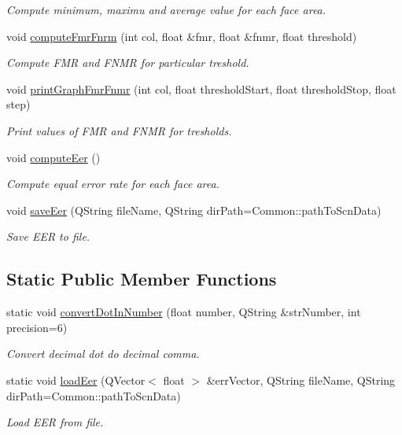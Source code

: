 \begin{DoxyCompactItemize}
\begin{DoxyCompactList}\small\item\em Compute minimum, maximu and average value for each face area. \end{DoxyCompactList}\item 
void \hyperlink{class_stats_a473b818344949038f30b72de2e88e323}{compute\+Fmr\+Fnrm} (int col, float \&fmr, float \&fnmr, float threshold)
\begin{DoxyCompactList}\small\item\em Compute F\+M\+R and F\+N\+M\+R for particular treshold. \end{DoxyCompactList}\item 
void \hyperlink{class_stats_a28e28f91a188f277f86c7de6c511b415}{print\+Graph\+Fmr\+Fnmr} (int col, float threshold\+Start, float threshold\+Stop, float step)
\begin{DoxyCompactList}\small\item\em Print values of F\+M\+R and F\+N\+M\+R for tresholds. \end{DoxyCompactList}\item 
\hypertarget{class_stats_a6f79c928497addbbd269f4723c5d9deb}{void \hyperlink{class_stats_a6f79c928497addbbd269f4723c5d9deb}{compute\+Eer} ()}\label{class_stats_a6f79c928497addbbd269f4723c5d9deb}

\begin{DoxyCompactList}\small\item\em Compute equal error rate for each face area. \end{DoxyCompactList}\item 
void \hyperlink{class_stats_a122a0658815a100a161757a575f5cf01}{save\+Eer} (Q\+String file\+Name, Q\+String dir\+Path=Common\+::path\+To\+Scn\+Data)
\begin{DoxyCompactList}\small\item\em Save E\+E\+R to file. \end{DoxyCompactList}\end{DoxyCompactItemize}
\subsection*{Static Public Member Functions}
\begin{DoxyCompactItemize}
\item 
static void \hyperlink{class_stats_a18bbfb9f7d603836cb90358abf0b523b}{convert\+Dot\+In\+Number} (float number, Q\+String \&str\+Number, int precision=6)
\begin{DoxyCompactList}\small\item\em Convert decimal dot do decimal comma. \end{DoxyCompactList}\item 
static void \hyperlink{class_stats_a7be329bf12951876f8ff2d5a6643b8c6}{load\+Eer} (Q\+Vector$<$ float $>$ \&err\+Vector, Q\+String file\+Name, Q\+String dir\+Path=Common\+::path\+To\+Scn\+Data)
\begin{DoxyCompactList}\small\item\em Load E\+E\+R from file. \end{DoxyCompactList}\end{DoxyCompactItemize}
